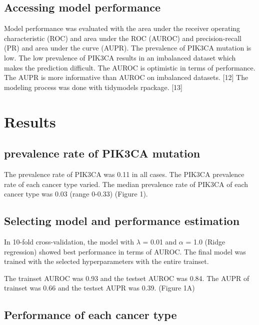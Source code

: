 \documentclass[10pt,letterpaper]{article}
\begin{document}
\hypertarget{accessing-model-performance}{%
\subsection{Accessing model
performance}\label{accessing-model-performance}}

Model performance was evaluated with the area under the receiver
operating characteristic (ROC) and area under the ROC (AUROC) and
precision-recall (PR) and area under the curve (AUPR). The prevalence of
PIK3CA mutation is low. The low prevalence of PIK3CA results in an
imbalanced dataset which makes the prediction difficult. The AUROC is
optimistic in terms of performance. The AUPR is more informative than
AUROC on imbalanced datasets. {[}12{]} The modeling process was done
with tidymodels rpackage. {[}13{]}

\hypertarget{results}{%
\section{Results}\label{results}}

\hypertarget{prevalence-rate-of-pik3ca-mutation}{%
\subsection{prevalence rate of PIK3CA
mutation}\label{prevalence-rate-of-pik3ca-mutation}}

The prevalence rate of PIK3CA was 0.11 in all cases. The PIK3CA
prevalence rate of each cancer type varied. The median prevalence rate
of PIK3CA of each cancer type was 0.03 (range 0-0.33) (Figure 1).

\hypertarget{selecting-model-and-performance-estimation}{%
\subsection{Selecting model and performance
estimation}\label{selecting-model-and-performance-estimation}}

In 10-fold cross-validation, the model with \(\lambda\) = 0.01 and
\(\alpha\) = 1.0 (Ridge regression) showed best performance in terms of
AUROC. The final model was trained with the selected hyperparameters
with the entire trainset.

The trainset AUROC was 0.93 and the testset AUROC was 0.84. The AUPR of
trainset was 0.66 and the testset AUPR was 0.39. (Figure 1A)

\hypertarget{performance-of-each-cancer-type}{%
\subsection{Performance of each cancer
type}\label{performance-of-each-cancer-type}}
\end{document}
